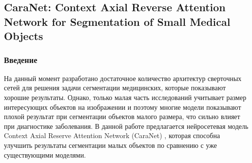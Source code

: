 
\subsection*{CaraNet: Context Axial Reverse Attention Network for Segmentation of Small Medical Objects}

\subsubsection*{Введение}

 На данный момент разработано достаточное количество архитектур 
 сверточных сетей для решения задачи сегментации медицинских, которые 
 показывают хорошие результаты. Однако, только малая часть 
 исследований учитывает размер интересующих объектов на изображении
 и поэтому многие модели показывают плохой результат при сегментации
 объектов малого размера, что сильно влияет при диагностике заболевания.
 В данной работе предлагается нейросетевая модель Context Axial
 Reserve Attention Network (CaraNet) \cite{CaraNet}, которая способна улучшить 
 результаты сегментации малых объектов по сравнению с уже существующими
 моделями. \par
